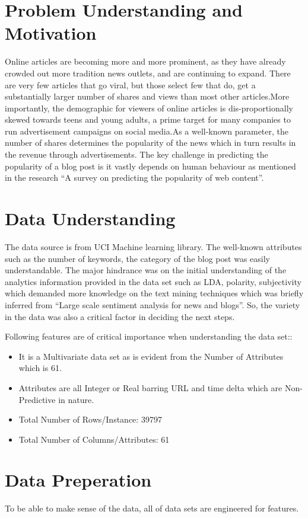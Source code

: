 \documentclass[sigchi]{acmart}
\begin{document}
\section{Problem Understanding and Motivation}
Online articles are becoming more and more prominent, as they have already crowded out more tradition news outlets, and are continuing to expand. There are very few articles that go viral, but those select few that do, get a substantially larger number of shares and views than most other articles.More importantly, the demographic for viewers of online articles is dis-proportionally skewed towards teens and young adults, a prime target for many companies to run advertisement campaigns on social media\cite{SocialMedia}.As a well-known parameter, the number of shares determines the popularity of the news which in turn results in the revenue through advertisements. The key challenge in predicting the popularity of a blog post is it vastly depends on human behaviour as mentioned in the research “A survey on predicting the popularity of web content”\cite{SurveyPrediction}.
\section{Data Understanding}
The data source is from UCI Machine learning library\cite{UCIOnlineNewsData}. The well-known attributes such as the number of keywords, the category of the blog post was easily understandable. The major hindrance was on the initial understanding of the analytics information provided in the data set such as LDA, polarity, subjectivity which demanded more knowledge on the text mining techniques which was briefly inferred from “Large scale sentiment analysis for news and blogs”\cite{Large-Scale}. So, the variety in the data was also a critical factor in deciding the next steps.

Following features are of critical importance when understanding the data set::
\begin{itemize}
\item  It is a Multivariate data set as is evident from the Number of Attributes which is 61.
\item Attributes are all Integer or Real barring URL and time delta which are Non-Predictive in nature.
\item Total Number of Rows/Instance: 39797
\item  Total Number of Columns/Attributes: 61
\end{itemize}

 
\section{Data Preperation}
To be able to make sense of the data, all of data sets are engineered for features.
\end{document}
